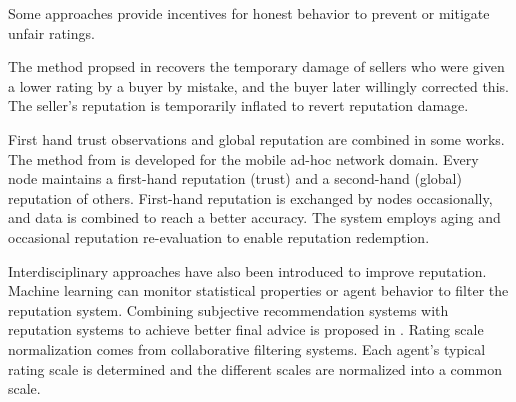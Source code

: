 \documentclass[%
    ]{\PathToTumTemplate/thesis/tum_thesis}
\begin{document}
Some approaches provide incentives for honest behavior to prevent or mitigate unfair ratings\cite{thakur_reputation_2019, jurca_minimum_2006}.

The method propsed in \cite{liu_reputation_2015} recovers the temporary damage of sellers who were given a lower rating by a buyer by mistake, and the buyer later willingly corrected this.
The seller's reputation is temporarily inflated to revert reputation damage.

First hand trust observations and global reputation are combined in some works\cite{boudec_robust_2003,huynh_handling_2005}.
The method from \cite{boudec_robust_2003} is developed for the mobile ad-hoc network domain.
Every node maintains a first-hand reputation (trust) and a second-hand (global) reputation of others.
First-hand reputation is exchanged by nodes occasionally, and data is combined to reach a better accuracy.
The system employs aging and occasional reputation re-evaluation to enable reputation redemption.

Interdisciplinary approaches have also been introduced to improve reputation.
Machine learning can monitor statistical properties or agent behavior to filter the reputation system\cite{khoshkbarchi_coping_2017,wang_bayesian_2003,yazidi_solving_2017}.
Combining subjective recommendation systems with reputation systems to achieve better final advice is proposed in \cite{hutchison_combining_2013}.
Rating scale normalization comes from collaborative filtering systems\cite{margaris_improving_2017,margaris_improving_2018}.
Each agent's typical rating scale is determined and the different scales are normalized into a common scale.





\end{document}

